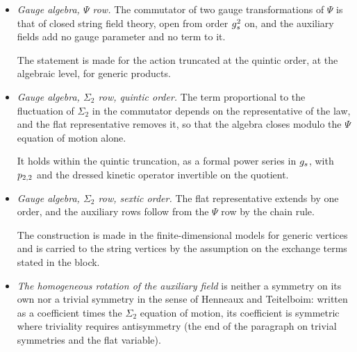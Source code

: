 \begin{itemize}
  \setlength{\itemsep}{1ex}

  \item \emph{Gauge algebra, $\Psi$ row.} The commutator of two gauge transformations of $\Psi$ is that of closed string field theory, open from order $g_s^2$ on, and the auxiliary fields add no gauge parameter and no term to it.


    The statement is made for the action truncated at the quintic order, at the algebraic level, for generic products.

  \item \emph{Gauge algebra, $\Sigma_2$ row, quintic order.} The term proportional to the fluctuation of $\Sigma_2$ in the commutator depends on the representative of the law, and the flat representative removes it, so that the algebra closes modulo the $\Psi$ equation of motion alone.


    It holds within the quintic truncation, as a formal power series in $g_s$, with $p_{2,2}$ and the dressed kinetic operator invertible on the quotient.

  \item \emph{Gauge algebra, $\Sigma_2$ row, sextic order.} The flat representative extends by one order, and the auxiliary rows follow from the $\Psi$ row by the chain rule.


    The construction is made in the finite-dimensional models for generic vertices and is carried to the string vertices by the assumption on the exchange terms stated in the block.

  \item \emph{The homogeneous rotation of the auxiliary field} is neither a symmetry on its own nor a trivial symmetry in the sense of Henneaux and Teitelboim: written as a coefficient times the $\Sigma_2$ equation of motion, its coefficient is symmetric where triviality requires antisymmetry (the end of the paragraph on trivial symmetries and the flat variable).



\end{itemize}
